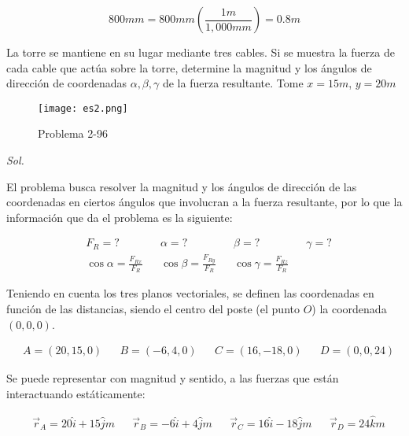\begin{equation*}
	800mm=800mm \left(\frac{1m}{1,000mm}\right)=0.8m
\end{equation*}



\begin{problem}
La torre se mantiene en su lugar mediante tres cables. Si se muestra la fuerza de cada cable que actúa sobre la torre, determine la magnitud y los ángulos de dirección de coordenadas $\alpha, \beta, \gamma$ de la fuerza resultante. Tome $x = 15 m$, $y = 20 m$
\end{problem}

\begin{figure}[h!]
	\centering
	\texttt{[image: es2.png]}
	\caption{Problema 2-96}
	\label{es2png}
\end{figure}

\textit{ Sol. }

El problema busca resolver la magnitud y los ángulos de dirección de las coordenadas en ciertos ángulos que involucran a la fuerza resultante, por lo que la información que da el problema es la siguiente:

\begin{align*}
	 & F_R=?                           &  & \alpha=?                       &  & \beta=?                         &  & \gamma=? \\
	 & \cos\alpha=\frac{F_{Rx}}{F_{R}} &  & \cos\beta=\frac{F_{Ry}}{F_{R}} &  & \cos\gamma=\frac{F_{Rz}}{F_{R}} &  &
\end{align*}

Teniendo en cuenta los tres planos vectoriales, se definen las coordenadas en función de las distancias, siendo el centro del poste (el punto $O$) la coordenada $(0,0,0)$.

\begin{align*}
	 & A=(20,15,0) &  & B=(-6,4,0) &  & C=(16,-18,0) &  & D=(0,0,24)
\end{align*}

\begin{notation}
	Se puede representar con magnitud y sentido, a las fuerzas que están interactuando estáticamente:

	\begin{align*}
		 & \overrightarrow{r}_A=20\hat{i}+15\hat{j}m
		 &                                           & \overrightarrow{r}_B=-6\hat{i}+4\hat{j}m
		 &                                           & \overrightarrow{r}_C=16\hat{i}-18\hat{j}m
		 &                                           & \overrightarrow{r}_D=24\hat{k}m
	\end{align*}
\end{notation}



